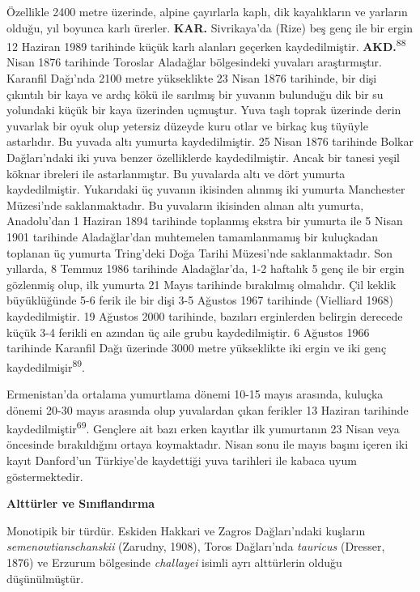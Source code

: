 \documentclass[
  letterpaper,
  DIV=11,
  numbers=noendperiod]{scrreprt}
\begin{document}
Özellikle 2400 metre üzerinde, alpine çayırlarla kaplı, dik kayalıkların
ve yarların olduğu, yıl boyunca karlı ürerler. \textbf{KAR.}
Sivrikaya'da (Rize) beş genç ile bir ergin 12 Haziran 1989 tarihinde
küçük karlı alanları geçerken kaydedilmiştir.
\textbf{AKD.}\textsuperscript{88} Nisan 1876 tarihinde Toroslar
Aladağlar bölgesindeki yuvaları araştırmıştır. Karanfil Dağı'nda 2100
metre yükseklikte 23 Nisan 1876 tarihinde, bir dişi çıkıntılı bir kaya
ve ardıç kökü ile sarılmış bir yuvanın bulunduğu dik bir su yolundaki
küçük bir kaya üzerinden uçmuştur. Yuva taşlı toprak üzerinde derin
yuvarlak bir oyuk olup yetersiz düzeyde kuru otlar ve birkaç kuş tüyüyle
astarlıdır. Bu yuvada altı yumurta kaydedilmiştir. 25 Nisan 1876
tarihinde Bolkar Dağları'ndaki iki yuva benzer özelliklerde
kaydedilmiştir. Ancak bir tanesi yeşil köknar ibreleri ile
astarlanmıştır. Bu yuvalarda altı ve dört yumurta kaydedilmiştir.
Yukarıdaki üç yuvanın ikisinden alınmış iki yumurta Manchester
Müzesi'nde saklanmaktadır. Bu yuvaların ikisinden alınan altı yumurta,
Anadolu'dan 1 Haziran 1894 tarihinde toplanmış ekstra bir yumurta ile 5
Nisan 1901 tarihinde Aladağlar'dan muhtemelen tamamlanmamış bir
kuluçkadan toplanan üç yumurta Tring'deki Doğa Tarihi Müzesi'nde
saklanmaktadır. Son yıllarda, 8 Temmuz 1986 tarihinde Aladağlar'da, 1-2
haftalık 5 genç ile bir ergin gözlenmiş olup, ilk yumurta 21 Mayıs
tarihinde bırakılmış olmalıdır. Çil keklik büyüklüğünde 5-6 ferik ile
bir dişi 3-5 Ağustos 1967 tarihinde (Vielliard 1968) kaydedilmiştir. 19
Ağustos 2000 tarihinde, bazıları erginlerden belirgin derecede küçük 3-4
ferikli en azından üç aile grubu kaydedilmiştir. 6 Ağustos 1966
tarihinde Karanfil Dağı üzerinde 3000 metre yükseklikte iki ergin ve iki
genç kaydedilmişir\textsuperscript{89}.

Ermenistan'da ortalama yumurtlama dönemi 10-15 mayıs arasında, kuluçka
dönemi 20-30 mayıs arasında olup yuvalardan çıkan ferikler 13 Haziran
tarihinde kaydedilmiştir\textsuperscript{69}. Gençlere ait bazı erken
kayıtlar ilk yumurtanın 23 Nisan veya öncesinde bırakıldığını ortaya
koymaktadır. Nisan sonu ile mayıs başını içeren iki kayıt Danford'un
Türkiye'de kaydettiği yuva tarihleri ile kabaca uyum göstermektedir.

\textbf{Alttürler ve Sınıflandırma}

Monotipik bir türdür. Eskiden Hakkari ve Zagros Dağları'ndaki kuşların
\emph{semenowtianschanskii} (Zarudny, 1908), Toros Dağları'nda
\emph{tauricus} (Dresser, 1876) ve Erzurum bölgesinde \emph{challayei}
isimli ayrı alttürlerin olduğu düşünülmüştür.
\end{document}
